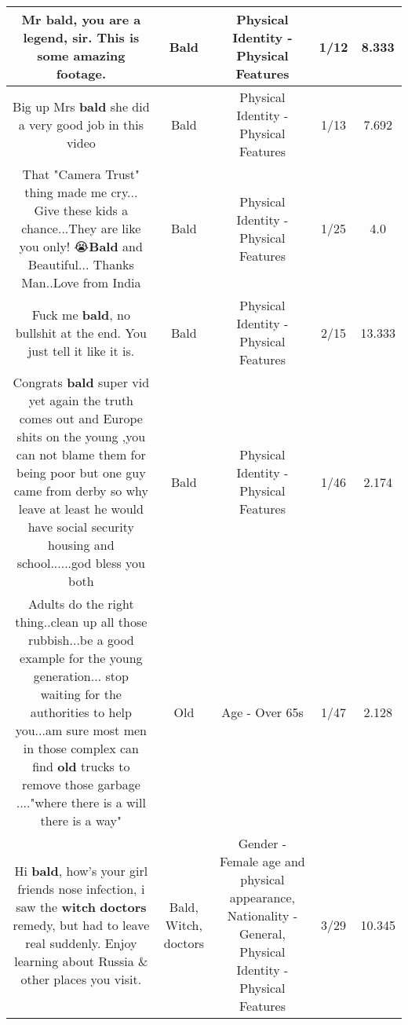 \documentclass[11pt]{article}
\newlength\mylength
\begin{document}
\begin{center}
\begin{longtable}{|C{.65\mylength}|C{.30\mylength}|C{.12\mylength}|C{.12\mylength}|C{.12\mylength}|}
  \small Mr \textbf{bald}, you are a legend, sir. This is some amazing footage.\normalsize   & Bald & Physical Identity - Physical Features & 1/12 & 8.333 \\  \hline
  \small Big up Mrs \textbf{bald} she did a very good job in this video\normalsize   & Bald & Physical Identity - Physical Features & 1/13 & 7.692 \\  \hline
  \small That "Camera Trust" thing made me cry... Give these kids a chance...They are like you only! 😭\textbf{Bald} and Beautiful... Thanks Man..Love from India\normalsize   & Bald & Physical Identity - Physical Features & 1/25 & 4.0 \\  \hline
  \small Fuck me \textbf{bald}, no bullshit at the end. You just tell it like it is.\normalsize   & Bald & Physical Identity - Physical Features & 2/15 & 13.333 \\  \hline
  \small Congrats \textbf{bald} super vid yet again the truth comes out and Europe shits on the young ,you can not blame them for being poor but one guy came from derby so why leave at least he would have social security housing and school......god bless you both\normalsize   & Bald & Physical Identity - Physical Features & 1/46 & 2.174 \\  \hline
  \small Adults do the right thing..clean up all those rubbish...be a good example for the young generation... stop waiting for the authorities to help you...am sure most men in those complex can find \textbf{old} trucks to remove those garbage ...."where there is a will there is a way"\normalsize   & Old & Age - Over 65s & 1/47 & 2.128 \\  \hline
  \small Hi \textbf{bald}, how's your girl friends nose infection, i saw the \textbf{witch} \textbf{doctors} remedy, but had to leave real suddenly. Enjoy learning about Russia \& other places you visit.\normalsize   & Bald, Witch, doctors & Gender - Female age and physical appearance, Nationality - General, Physical Identity - Physical Features & 3/29 & 10.345 \\  \hline

\end{longtable}
\end{center}
\end{document}
